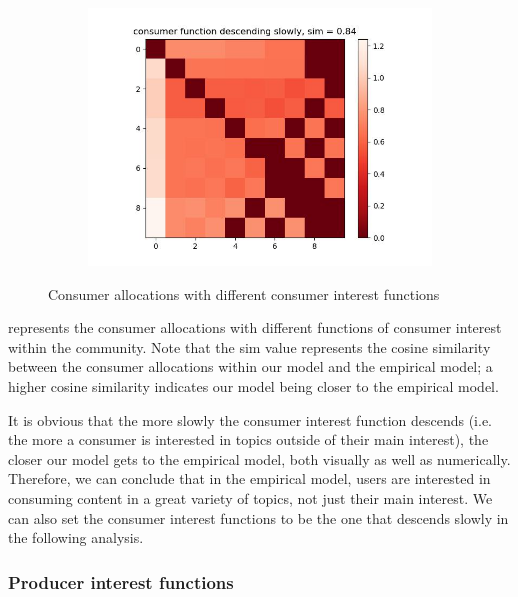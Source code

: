 \documentclass[11pt, letterpaper]{article}
\begin{document}
\begin{figure}[h]
\begin{adjustbox}{max width=1.5\textwidth,center}
\begin{subfigure}[b]{0.45\textwidth}
        \includegraphics[width=\linewidth]{"figures/f/descending slowly_heatmap.jpg"}
    \end{subfigure}
\end{adjustbox}
\caption{Consumer allocations with different consumer interest functions}
\label{fig:f_heatmap}
\end{figure}

 represents the consumer allocations with different functions of consumer interest within the community. Note that the sim value represents the cosine similarity between the consumer allocations within our model and the empirical model; a higher cosine similarity indicates our model being closer to the empirical model.

It is obvious that the more slowly the consumer interest function descends (i.e. the more a consumer is interested in topics outside of their main interest), the closer our model gets to the empirical model, both visually as well as numerically. Therefore, we can conclude that in the empirical model, users are interested in consuming content in a great variety of topics, not just their main interest. We can also set the consumer interest functions to be the one that descends slowly in the following analysis.

\subsubsection{Producer interest functions}
\end{document}
